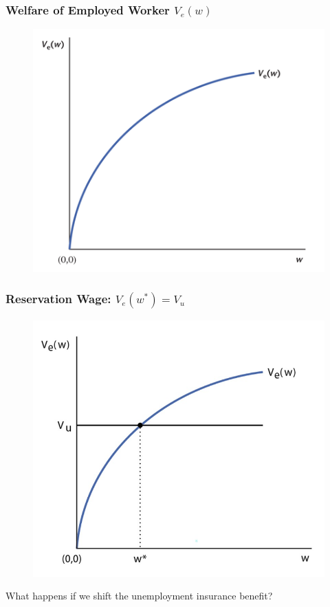 \documentclass{beamer}
\begin{document}
\begin{frame}
\frametitle[alignment=center]{Welfare of Employed Worker $V_e(w)$}
\begin{figure}
\centering
\includegraphics[scale=0.5]{Figures/W_Fig_6pt9.png}
\end{figure}
\end{frame}

\begin{frame}
\frametitle[alignment=center]{Reservation Wage: $V_e(w^*)=V_u$}
\begin{figure}
\centering
\includegraphics[scale=0.5]{Figures/W_Fig_6pt10.png}
\end{figure}
What happens if we shift the unemployment insurance benefit?
\end{frame}
\end{document}
